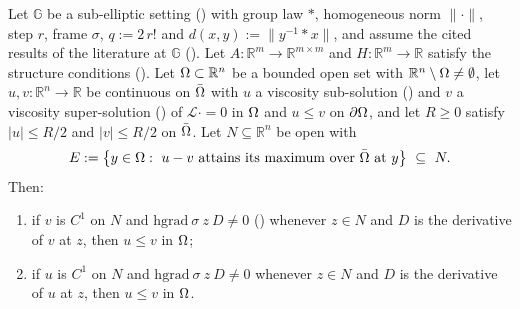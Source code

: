 \begin{theorem}[Theorem~1.3(i)]
Let $\mathbb G$ be a sub-elliptic setting () with group law $*$,
homogeneous norm $\|\cdot\|$, step $r$, frame $\sigma$, $q:=2\,r!$ and
$d(x,y):=\|y^{-1}*x\|$, and assume the cited results of the literature
at $\mathbb G$ (). Let $A:\mathbb R^{m}\to\mathbb R^{m\times m}$ and
$H:\mathbb R^{m}\to\mathbb R$ satisfy the structure conditions
(). Let $\Omega\subset\mathbb R^{n}$ be a bounded open set with
$\mathbb R^{n}\setminus\Omega\ne\emptyset$, let $u,v:\mathbb R^{n}\to\mathbb R$ be continuous on
$\bar{\Omega}$ with $u$ a viscosity sub-solution () and $v$ a viscosity
super-solution () of $\mathcal L\cdot=0$ in $\Omega$ and $u\le v$ on
$\partial\Omega$, and let $R\ge0$ satisfy $|u|\le R/2$ and $|v|\le R/2$ on $\bar{\Omega}$. Let
$N\subseteq\mathbb R^{n}$ be open with
\[
 E:=\big\{y\in\Om:\ u-v\ \text{attains its maximum over}\ \bar\Om\ \text{at}\ y\big\}
 \ \subseteq\ N .
\]
Then:
\begin{enumerate}
\item if $v$ is $C^{1}$ on $N$ and $\mathrm{hgrad}\ \sigma\ z\ D\ne0$ ()
  whenever $z\in N$ and $D$ is the derivative of $v$ at $z$, then $u\le v$ in $\Omega$;
\item if $u$ is $C^{1}$ on $N$ and $\mathrm{hgrad}\ \sigma\ z\ D\ne0$ whenever $z\in N$ and
  $D$ is the derivative of $u$ at $z$, then $u\le v$ in $\Omega$.
\end{enumerate}
\end{theorem}
